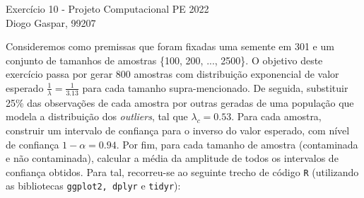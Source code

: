 \documentclass[10pt]{article}
\newcommand{\gaspar}{Diogo Gaspar, 99207}
\begin{document}
\begin{center}
{\huge{Exercício 10 - Projeto Computacional PE 2022}} \\
\vspace{1.5mm}
{\large{\gaspar}} \\
\end{center}

Consideremos como premissas que foram fixadas uma semente em 301 e um conjunto de
tamanhos de amostras \{100, 200, ..., 2500\}.
O objetivo deste exercício passa por gerar 800 amostras com distribuição exponencial
de valor esperado $\frac{1}{\lambda} = \frac{1}{3.13}$ para cada tamanho supra-mencionado.
De seguida, substituir 25\% das observações de cada amostra por outras geradas de uma
população que modela a distribuição dos \textit{outliers}, tal que $\lambda_c = 0.53$.
Para cada amostra, construir um intervalo de confiança para o inverso do valor esperado,
com nível de confiança $1 - \alpha = 0.94$. 
Por fim, para cada tamanho de amostra (contaminada e não contaminada),
calcular a média da amplitude de todos os intervalos de confiança obtidos.
Para tal, recorreu-se ao seguinte trecho de código \texttt{R} (utilizando as bibliotecas \texttt{ggplot2, dplyr} e \texttt{tidyr}):
\end{document}
